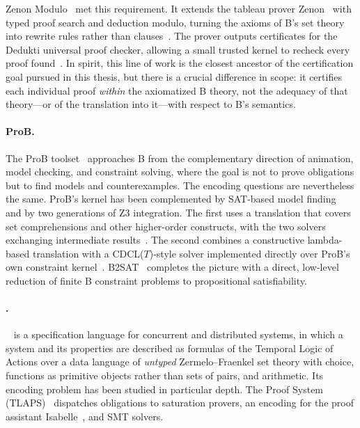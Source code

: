 Zenon Modulo~\cite{delahaye2013zenon} met this requirement. It extends the
tableau prover Zenon~\cite{bonichon2007zenon} with typed proof search and
deduction modulo, turning the axioms of B's set theory into rewrite rules rather
than clauses~\cite{bury2015automated}. The prover outputs certificates for the
Dedukti universal proof checker, allowing a small trusted kernel to recheck
every proof found~\cite{halmagrand2016automated}. In spirit, this line of work is
the closest ancestor of the certification goal pursued in this thesis, but
there is a crucial difference in scope: it certifies each individual proof
\emph{within} the axiomatized B theory, not the adequacy of that theory---or of
the translation into it---with respect to B's semantics.

\paragraph*{ProB.}
The ProB toolset~\cite{leuschel2008prob} approaches B from the complementary
direction of animation, model checking, and constraint solving, where the goal
is not to prove obligations but to find models and counterexamples. The
encoding questions are nevertheless the same. ProB's kernel has been
complemented by SAT-based model finding~\cite{plagge2012validating} and by two
generations of Z3 integration. The first uses a translation that covers set
comprehensions and other higher-order constructs, with the two solvers
exchanging intermediate results~\cite{krings2016smt}. The second combines a
constructive lambda-based translation with a CDCL(\(T\))-style solver
implemented directly over ProB's own constraint
kernel~\cite{schmidt2022smt}. B2SAT~\cite{leuschel2024b2sat} completes the
picture with a direct, low-level reduction of finite B constraint problems to
propositional satisfiability.

\paragraph*{\tlaplus.}
\tlaplus~\cite{lamport2002specifying} is a specification language for
concurrent and distributed systems, in which a system and its properties are
described as formulas of the Temporal Logic of Actions over a data language of
\emph{untyped} Zermelo--Fraenkel set theory with choice, functions as primitive
objects rather than sets of pairs, and arithmetic. Its encoding problem has been
studied in particular depth. The \tlaplus Proof System
(TLAPS)~\cite{cousineau2012tlaproofs} dispatches obligations to saturation
provers, an encoding for the proof assistant Isabelle~\cite{NipkowPaulsonWenzel2002}, and SMT solvers.


